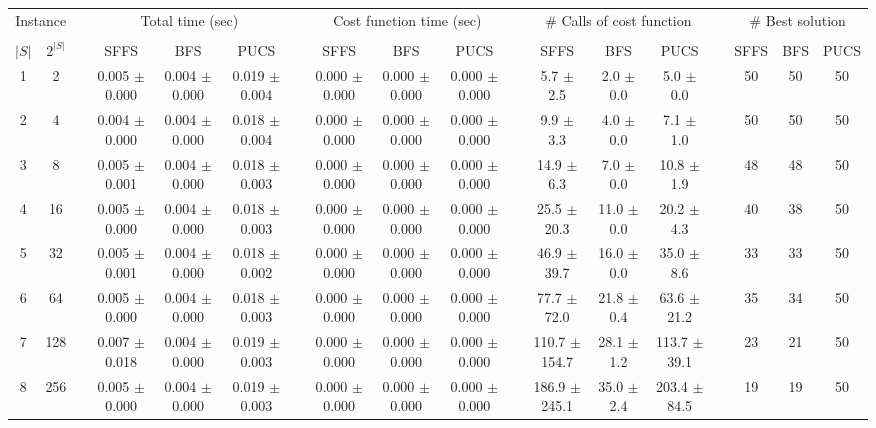 \documentclass[11pt]{article}
\begin{document}
\begin{landscape}
\begin{table}
\centering
\footnotesize
\begin{tabular}{cccccccccccccccccc}
\toprule
\multicolumn{2}{c}{Instance} & \phantom{} & \multicolumn{3}{c}{Total time (sec)}  & \phantom{} & \multicolumn{3}{c}{Cost function time (sec)}  & \phantom{} & \multicolumn{3}{c}{\# Calls of cost function}  & \phantom{} & \multicolumn{3}{c}{\# Best solution}\\
\cline{1-2}\cline{4-6}\cline{8-10}\cline{12-14}\cline{16-18}\\
$|S|$ & $2^{|S|}$ && SFFS & BFS & PUCS && SFFS & BFS & PUCS && SFFS & BFS & PUCS && SFFS & BFS & PUCS \\
 1 &       2 &&  0.005 $\pm$ 0.000 & 0.004 $\pm$ 0.000 & 0.019 $\pm$ 0.004 &&  0.000 $\pm$ 0.000 & 0.000 $\pm$ 0.000 & 0.000 $\pm$ 0.000 &&   5.7 $\pm$  2.5 &  2.0 $\pm$  0.0 &  5.0 $\pm$  0.0 && 50& 50& 50\\
 2 &       4 &&  0.004 $\pm$ 0.000 & 0.004 $\pm$ 0.000 & 0.018 $\pm$ 0.004 &&  0.000 $\pm$ 0.000 & 0.000 $\pm$ 0.000 & 0.000 $\pm$ 0.000 &&   9.9 $\pm$  3.3 &  4.0 $\pm$  0.0 &  7.1 $\pm$  1.0 && 50& 50& 50\\
 3 &       8 &&  0.005 $\pm$ 0.001 & 0.004 $\pm$ 0.000 & 0.018 $\pm$ 0.003 &&  0.000 $\pm$ 0.000 & 0.000 $\pm$ 0.000 & 0.000 $\pm$ 0.000 &&  14.9 $\pm$  6.3 &  7.0 $\pm$  0.0 & 10.8 $\pm$  1.9 && 48& 48& 50\\
 4 &      16 &&  0.005 $\pm$ 0.000 & 0.004 $\pm$ 0.000 & 0.018 $\pm$ 0.003 &&  0.000 $\pm$ 0.000 & 0.000 $\pm$ 0.000 & 0.000 $\pm$ 0.000 &&  25.5 $\pm$ 20.3 & 11.0 $\pm$  0.0 & 20.2 $\pm$  4.3 && 40& 38& 50\\
 5 &      32 &&  0.005 $\pm$ 0.001 & 0.004 $\pm$ 0.000 & 0.018 $\pm$ 0.002 &&  0.000 $\pm$ 0.000 & 0.000 $\pm$ 0.000 & 0.000 $\pm$ 0.000 &&  46.9 $\pm$ 39.7 & 16.0 $\pm$  0.0 & 35.0 $\pm$  8.6 && 33& 33& 50\\
 6 &      64 &&  0.005 $\pm$ 0.000 & 0.004 $\pm$ 0.000 & 0.018 $\pm$ 0.003 &&  0.000 $\pm$ 0.000 & 0.000 $\pm$ 0.000 & 0.000 $\pm$ 0.000 &&  77.7 $\pm$ 72.0 & 21.8 $\pm$  0.4 & 63.6 $\pm$ 21.2 && 35& 34& 50\\
 7 &     128 &&  0.007 $\pm$ 0.018 & 0.004 $\pm$ 0.000 & 0.019 $\pm$ 0.003 &&  0.000 $\pm$ 0.000 & 0.000 $\pm$ 0.000 & 0.000 $\pm$ 0.000 &&  110.7 $\pm$ 154.7 & 28.1 $\pm$  1.2 & 113.7 $\pm$ 39.1 && 23& 21& 50\\
 8 &     256 &&  0.005 $\pm$ 0.000 & 0.004 $\pm$ 0.000 & 0.019 $\pm$ 0.003 &&  0.000 $\pm$ 0.000 & 0.000 $\pm$ 0.000 & 0.000 $\pm$ 0.000 &&  186.9 $\pm$ 245.1 & 35.0 $\pm$  2.4 & 203.4 $\pm$ 84.5 && 19& 19& 50\\

\end{tabular}
\end{table}
\end{landscape}
\end{document}
